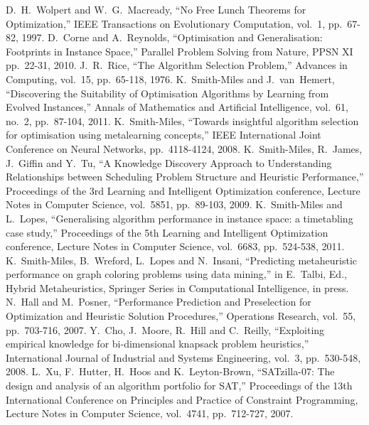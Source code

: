 \documentclass[conference]{IEEEtran}
\begin{document}
\begin{thebibliography}{99} \setlength\itemsep{0.7ex plus 0.2ex minus 0ex}
D.~H.~Wolpert and W.~G.~Macready, ``No Free Lunch Theorems for Optimization,'' IEEE Transactions on Evolutionary Computation, vol.~1, pp.~67-82, 1997.
D.~Corne and A.~Reynolds, ``Optimisation and Generalisation: Footprints in Instance Space,'' Parallel Problem Solving from Nature, PPSN XI pp.~22-31, 2010.
J.~R.~Rice, ``The Algorithm Selection Problem,'' Advances in Computing, vol.~15, pp.~65-118, 1976.
K.~Smith-Miles and J.~van~Hemert, ``Discovering the Suitability of Optimisation Algorithms by Learning from Evolved Instances,'' Annals of Mathematics and Artificial Intelligence, vol.~61, no.~2, pp.~87-104, 2011.
K.~Smith-Miles, ``Towards insightful algorithm selection for optimisation using metalearning concepts,'' IEEE International Joint Conference on Neural Networks, pp.~4118-4124, 2008.
K.~Smith-Miles, R.~James, J.~Giffin and Y.~Tu, ``A Knowledge Discovery Approach to Understanding Relationships between Scheduling Problem Structure and Heuristic Performance,'' Proceedings of the 3rd Learning and Intelligent Optimization conference, Lecture Notes in Computer Science, vol.~5851, pp.~89-103, 2009.
K.~Smith-Miles and L.~Lopes, ``Generalising algorithm performance in instance space: a timetabling case study,'' Proceedings of the 5th Learning and Intelligent Optimization conference, Lecture Notes in Computer Science, vol.~6683, pp.~524-538, 2011.
K.~Smith-Miles, B.~Wreford, L.~Lopes and N.~Insani, ``Predicting metaheuristic performance on graph coloring problems using data mining,'' in E.~Talbi, Ed., Hybrid Metaheuristics, Springer Series in Computational Intelligence, in press.
N.~Hall and M.~Posner, ``Performance Prediction and Preselection for Optimization and Heuristic Solution Procedures,'' Operations Research, vol.~55, pp.~703-716, 2007.
Y.~Cho, J.~Moore, R.~Hill and C.~Reilly, ``Exploiting empirical knowledge for bi-dimensional knapsack problem heuristics,'' International Journal of Industrial and Systems Engineering, vol.~3, pp.~530-548, 2008.
L.~Xu, F.~Hutter, H.~Hoos and K.~Leyton-Brown, ``SATzilla-07: The design and analysis of an algorithm portfolio for SAT,'' Proceedings of the 13th International Conference on Principles and Practice of Constraint Programming, Lecture Notes in Computer Science, vol.~4741, pp.~712-727, 2007.

\end{thebibliography}
\end{document}
